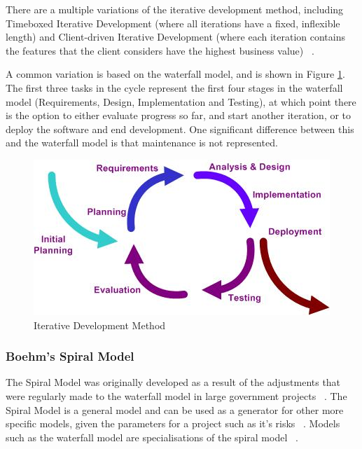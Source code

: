 \documentclass{article}
\begin{document}
There are a multiple variations of the iterative development method, including Timeboxed Iterative Development (where all iterations have a fixed, inflexible length) and Client-driven Iterative Development (where each iteration contains the features that the client considers have the highest business value) ~\cite{larman2004agile}.

A common variation is based on the waterfall model, and is shown in Figure \ref{fig:iterativeDevelopment}.  The first three tasks in the cycle represent the first four stages in the waterfall model (Requirements, Design, Implementation and Testing), at which point there is the option to either evaluate progress so far, and start another iteration, or to deploy the software and end development.  One significant difference between this and the waterfall model is that maintenance is not represented.


\begin{figure}[htb] 
\centering
    \includegraphics[width=0.8\linewidth]{iterativeDevelopment}
\caption{Iterative Development Method}
\label{fig:iterativeDevelopment}
\end{figure}

\subsubsection{Boehm's Spiral Model}
The Spiral Model was originally developed as a result of the adjustments that were regularly made to the waterfall model in large government projects ~\cite{spiralModelSoftwareDevelopment}.  The Spiral Model is a general model and can be used as a generator for other more specific models, given the parameters for a project such as it's risks ~\cite{boehm2000spiral}.  Models such as the waterfall model are specialisations of the spiral model ~\cite{boehm2000spiral}.

\end{document}
